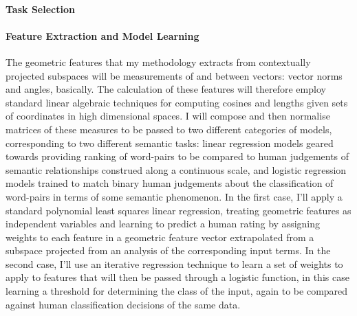 \paragraph{Task Selection} 

\paragraph{Feature Extraction and Model Learning} The geometric features that my methodology extracts from contextually projected subspaces will be measurements of and between vectors: vector norms and angles, basically.  The calculation of these features will therefore employ standard linear algebraic techniques for computing cosines and lengths given sets of coordinates in high dimensional spaces.  I will compose and then normalise matrices of these measures to be passed to two different categories of models, corresponding to two different semantic tasks: linear regression models geared towards providing ranking of word-pairs to be compared to human judgements of semantic relationships construed along a continuous scale, and logistic regression models trained to match binary human judgements about the classification of word-pairs in terms of some semantic phenomenon.  In the first case, I'll apply a standard polynomial least squares linear regression, treating geometric features as independent variables and learning to predict a human rating by assigning weights to each feature in a geometric feature vector extrapolated from a subspace projected from an analysis of the corresponding input terms.  In the second case, I'll use an iterative regression technique to learn a set of weights to apply to features that will then be passed through a logistic function, in this case learning a threshold for determining the class of the input, again to be compared against human classification decisions of the same data.

